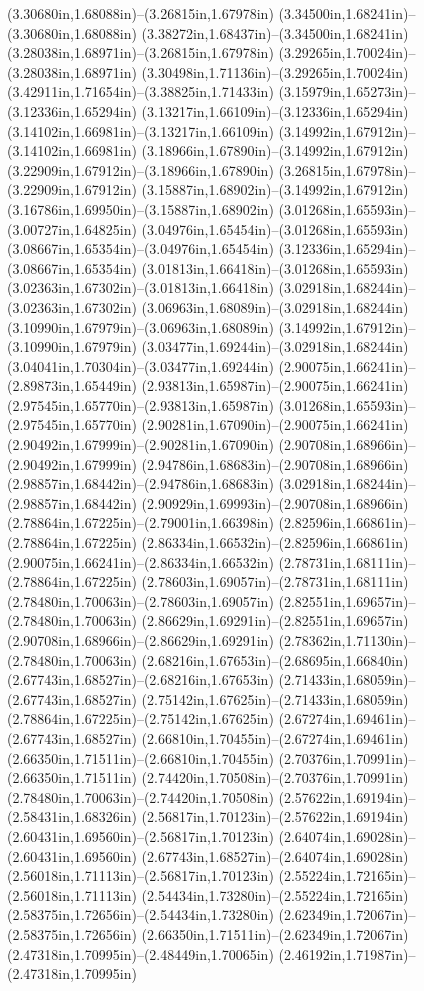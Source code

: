 (3.30680in,1.68088in)--(3.26815in,1.67978in) (3.34500in,1.68241in)--(3.30680in,1.68088in) (3.38272in,1.68437in)--(3.34500in,1.68241in) (3.28038in,1.68971in)--(3.26815in,1.67978in) (3.29265in,1.70024in)--(3.28038in,1.68971in) (3.30498in,1.71136in)--(3.29265in,1.70024in) (3.42911in,1.71654in)--(3.38825in,1.71433in) (3.15979in,1.65273in)--(3.12336in,1.65294in) (3.13217in,1.66109in)--(3.12336in,1.65294in) (3.14102in,1.66981in)--(3.13217in,1.66109in) (3.14992in,1.67912in)--(3.14102in,1.66981in) (3.18966in,1.67890in)--(3.14992in,1.67912in) (3.22909in,1.67912in)--(3.18966in,1.67890in) (3.26815in,1.67978in)--(3.22909in,1.67912in) (3.15887in,1.68902in)--(3.14992in,1.67912in) (3.16786in,1.69950in)--(3.15887in,1.68902in) (3.01268in,1.65593in)--(3.00727in,1.64825in) (3.04976in,1.65454in)--(3.01268in,1.65593in) (3.08667in,1.65354in)--(3.04976in,1.65454in) (3.12336in,1.65294in)--(3.08667in,1.65354in) (3.01813in,1.66418in)--(3.01268in,1.65593in) (3.02363in,1.67302in)--(3.01813in,1.66418in) (3.02918in,1.68244in)--(3.02363in,1.67302in) (3.06963in,1.68089in)--(3.02918in,1.68244in) (3.10990in,1.67979in)--(3.06963in,1.68089in) (3.14992in,1.67912in)--(3.10990in,1.67979in) (3.03477in,1.69244in)--(3.02918in,1.68244in) (3.04041in,1.70304in)--(3.03477in,1.69244in) (2.90075in,1.66241in)--(2.89873in,1.65449in) (2.93813in,1.65987in)--(2.90075in,1.66241in) (2.97545in,1.65770in)--(2.93813in,1.65987in) (3.01268in,1.65593in)--(2.97545in,1.65770in) (2.90281in,1.67090in)--(2.90075in,1.66241in) (2.90492in,1.67999in)--(2.90281in,1.67090in) (2.90708in,1.68966in)--(2.90492in,1.67999in) (2.94786in,1.68683in)--(2.90708in,1.68966in) (2.98857in,1.68442in)--(2.94786in,1.68683in) (3.02918in,1.68244in)--(2.98857in,1.68442in) (2.90929in,1.69993in)--(2.90708in,1.68966in) (2.78864in,1.67225in)--(2.79001in,1.66398in) (2.82596in,1.66861in)--(2.78864in,1.67225in) (2.86334in,1.66532in)--(2.82596in,1.66861in) (2.90075in,1.66241in)--(2.86334in,1.66532in) (2.78731in,1.68111in)--(2.78864in,1.67225in) (2.78603in,1.69057in)--(2.78731in,1.68111in) (2.78480in,1.70063in)--(2.78603in,1.69057in) (2.82551in,1.69657in)--(2.78480in,1.70063in) (2.86629in,1.69291in)--(2.82551in,1.69657in) (2.90708in,1.68966in)--(2.86629in,1.69291in) (2.78362in,1.71130in)--(2.78480in,1.70063in) (2.68216in,1.67653in)--(2.68695in,1.66840in) (2.67743in,1.68527in)--(2.68216in,1.67653in) (2.71433in,1.68059in)--(2.67743in,1.68527in) (2.75142in,1.67625in)--(2.71433in,1.68059in) (2.78864in,1.67225in)--(2.75142in,1.67625in) (2.67274in,1.69461in)--(2.67743in,1.68527in) (2.66810in,1.70455in)--(2.67274in,1.69461in) (2.66350in,1.71511in)--(2.66810in,1.70455in) (2.70376in,1.70991in)--(2.66350in,1.71511in) (2.74420in,1.70508in)--(2.70376in,1.70991in) (2.78480in,1.70063in)--(2.74420in,1.70508in) (2.57622in,1.69194in)--(2.58431in,1.68326in) (2.56817in,1.70123in)--(2.57622in,1.69194in) (2.60431in,1.69560in)--(2.56817in,1.70123in) (2.64074in,1.69028in)--(2.60431in,1.69560in) (2.67743in,1.68527in)--(2.64074in,1.69028in) (2.56018in,1.71113in)--(2.56817in,1.70123in) (2.55224in,1.72165in)--(2.56018in,1.71113in) (2.54434in,1.73280in)--(2.55224in,1.72165in) (2.58375in,1.72656in)--(2.54434in,1.73280in) (2.62349in,1.72067in)--(2.58375in,1.72656in) (2.66350in,1.71511in)--(2.62349in,1.72067in) (2.47318in,1.70995in)--(2.48449in,1.70065in) (2.46192in,1.71987in)--(2.47318in,1.70995in) 